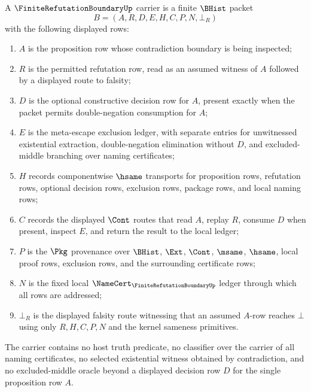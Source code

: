 \begin{definition}
\label{def:finite-refutation-boundary-carrier}
A $\FiniteRefutationBoundaryUp$ carrier is a finite $\BHist$ packet
$$
B=(A,R,D,E,H,C,P,N,\bot_R)
$$
with the following displayed rows:
\begin{enumerate}
\item $A$ is the proposition row whose contradiction boundary is being inspected;
\item $R$ is the permitted refutation row, read as an assumed witness of $A$ followed by a displayed route to falsity;
\item $D$ is the optional constructive decision row for $A$, present exactly when the packet permits double-negation consumption for $A$;
\item $E$ is the meta-escape exclusion ledger, with separate entries for unwitnessed existential extraction, double-negation elimination without $D$, and excluded-middle branching over naming certificates;
\item $H$ records componentwise $\hsame$ transports for proposition rows, refutation rows, optional decision rows, exclusion rows, package rows, and local naming rows;
\item $C$ records the displayed $\Cont$ routes that read $A$, replay $R$, consume $D$ when present, inspect $E$, and return the result to the local ledger;
\item $P$ is the $\Pkg$ provenance over $\BHist$, $\Ext$, $\Cont$, $\msame$, $\hsame$, local proof rows, exclusion rows, and the surrounding certificate rows;
\item $N$ is the fixed local $\NameCert_{\FiniteRefutationBoundaryUp}$ ledger through which all rows are addressed;
\item $\bot_R$ is the displayed falsity route witnessing that an assumed $A$-row reaches $\bot$ using only $R,H,C,P,N$ and the kernel sameness primitives.
\end{enumerate}
The carrier contains no host truth predicate, no classifier over the carrier of all naming certificates, no selected existential witness obtained by contradiction, and no excluded-middle oracle beyond a displayed decision row $D$ for the single proposition row $A$.
\end{definition}

